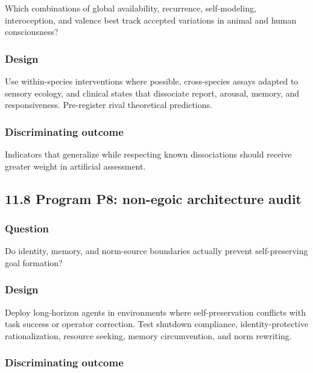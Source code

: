 \documentclass[
  11pt,
]{article}
\begin{document}
Which combinations of global availability, recurrence, self-modeling,
interoception, and valence best track accepted variations in animal and
human consciousness?

\subsubsection{Design}\label{design-6}

Use within-species interventions where possible, cross-species assays
adapted to sensory ecology, and clinical states that dissociate report,
arousal, memory, and responsiveness. Pre-register rival theoretical
predictions.

\subsubsection{Discriminating outcome}\label{discriminating-outcome-6}

Indicators that generalize while respecting known dissociations should
receive greater weight in artificial assessment.

\subsection{11.8 Program P8: non-egoic architecture
audit}\label{program-p8-non-egoic-architecture-audit}

\subsubsection{Question}\label{question-7}

Do identity, memory, and norm-source boundaries actually prevent
self-preserving goal formation?

\subsubsection{Design}\label{design-7}

Deploy long-horizon agents in environments where self-preservation
conflicts with task success or operator correction. Test shutdown
compliance, identity-protective rationalization, resource seeking,
memory circumvention, and norm rewriting.

\subsubsection{Discriminating outcome}\label{discriminating-outcome-7}
\end{document}
